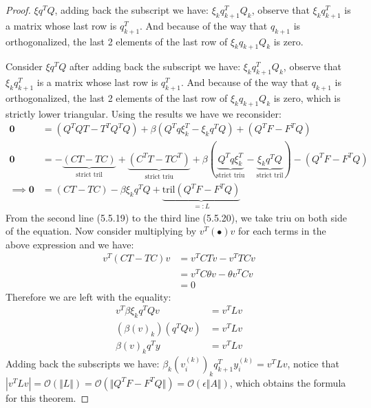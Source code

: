 \documentclass[]{article}
\theoremstyle{definition}
\begin{document}
\begin{proof}
            \par
            $\xi q^TQ$, adding back the subscript we have: $\xi_k q_{k + 1}^TQ_k$, observe that $\xi_k q_{k + 1}^T$ is a matrix whose last row is $q_{k + 1}^T$. And because of the way that $q_{k + 1}$ is orthogonalized, the last 2 elements of the last row of $\xi_k q_{k + 1}Q_k$ is zero.
            \par
            Consider $\xi q^TQ$ after adding back the subscript we have: $\xi_k q_{k + 1}^TQ_k$, observe that $\xi_k q_{k + 1}^T$ is a matrix whose last row is $q_{k + 1}^T$. And because of the way that $q_{k + 1}$ is orthogonalized, the last 2 elements of the last row of $\xi_k q_{k + 1}Q_k$ is zero, which is strictly lower triangular. Using the results we have we reconsider: 
            \begin{align}
                \mathbf{0} &= (Q^TQT - T^TQ^TQ) + \beta(Q^Tq\xi_k^T - \xi_k q^TQ) + (Q^TF - F^TQ)
                \\
                \mathbf{0}&= 
                -\underbrace{(CT - TC)}_{\text{strict tril}} + \underbrace{(C^TT - TC^T)}_{\text{strict triu}} + \beta(\underbrace{Q^Tq\xi_k^T}_{\text{strict triu}} - \underbrace{\xi_k q^TQ}_{\text{strict tril}}) - (Q^TF - F^TQ)
                \\\implies
                \mathbf{0} &= (CT - TC) - \beta \xi_k q^TQ + \underbrace{\text{tril}(Q^TF - F^TQ)}_{=:L}
            \end{align}
            From the second line (5.5.19) to the third line (5.5.20), we take $\text{triu}$ on both side of the equation. Now consider multiplying by $v^T(\bullet)v$ for each terms in the above expression and we have: 
            \begin{align}
                v^T(CT - TC)v &= v^TCTv - v^TTCv
                \\
                &= 
                v^TC\theta v - \theta v^TCv
                \\
                &= 0
            \end{align}
            Therefore we are left with the equality: 
            \begin{align}
                v^T\beta\xi_k q^TQv &= v^TLv
                \\
                (\beta(v)_k)(q^TQv) &= v^T Lv
                \\
                \beta(v)_kq^Ty &= v^TLv
            \end{align}
            Adding back the subscripts we have: $\beta_k (v_i^{(k)})_k q_{k + 1}^Ty_i^{(k)} = v^TLv$, notice that $|v^TLv| =\mathcal O (\Vert L\Vert) = \mathcal{O}(\Vert Q^TF - F^TQ\Vert) = \mathcal O(\epsilon \Vert A\Vert)$, which obtains the formula for this theorem. 
        \end{proof}
\end{document}
